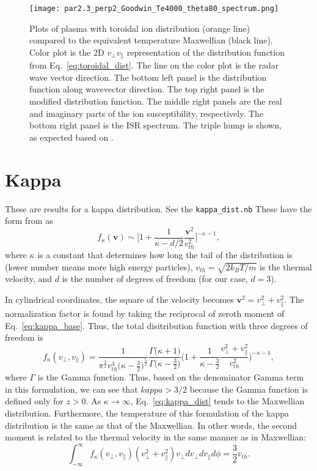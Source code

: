 \begin{figure}[!htb]
	\texttt{[image: par2.3\_perp2\_Goodwin\_Te4000\_theta80\_spectrum.png]}
	\caption{Plots of plasma with toroidal ion distribution (orange line) compared to the equivalent temperature Maxwellian (black line).
	Color plot is the 2D $v_\perp v_\parallel$ representation of the distribution function from Eq.~\ref{eq:toroidal_dist}.
	The line on the color plot is the radar wave vector direction.
	The bottom left panel is the distribution function along wavevector direction.
	The top right panel is the modified distribution function.
	The middle right panels are the real and imaginary parts of the ion susceptibility, respectively.
	The bottom right panel is the ISR spectrum.
	The triple hump is shown, as expected based on \cite{goodwin2018}.}
	\label{f:toroidal}
\end{figure}


\section{Kappa}

These are results for a kappa distribution. See the \verb*|kappa_dist.nb| These have the form from \citep{livadiotis2015} as
\begin{equation}
	f_\kappa(\mathbf{v}) \sim \Bigg[   
	1 + \frac{1}{\kappa-d/2} \frac{\mathbf{v}^2}{v_{th}^2}
	\Bigg]^{-\kappa-1},
	\label{eq:kappa_base}
\end{equation}
where $\kappa$ is a constant that determines how long the tail of the distribution is (lower number means more high energy particles),
$v_{th}=\sqrt{2k_BT/m}$ is the thermal velocity,
and $d$ is the number of degrees of freedom (for our case, $d=3$).

In cylindrical coordinates, the square of the velocity becomes $\mathbf{v}^2=v_\perp^2+v_\parallel^2$. 
The normalization factor is found by taking the reciprocal of zeroth moment of Eq.~\ref{eq:kappa_base}.
Thus, the total disitribution function with three degrees of freedom is
\begin{equation}
	f_{\kappa}(v_\perp,v_\parallel) = 
	\frac{1}{\pi^{\frac{3}{2}} v_{th}^3 \big(\kappa-\frac{3}{2}\big)^{\frac{5}{2}}}
	\frac{\Gamma\big(\kappa+1\big)}{\Gamma\big(\kappa-\frac{3}{2}\big)}
	\Bigg( 1 + \frac{1}{\kappa-\frac{3}{2}} \frac{v_\perp^2+v_\parallel^2}{v_{th}^2}
	\Bigg)^{-\kappa-1},
	\label{eq:kappa_dist}
\end{equation}
where $\Gamma$ is the Gamma function.
Thus, based on the denominator Gamma term in this formulation, we can see that $kappa>3/2$ because the Gamma function is defined only for $z>0$.
As $\kappa\rightarrow\infty$, Eq.~\ref{eq:kappa_dist} tends to the Maxwellian distribution.
Furthermore, the temperature of this formulation of the kappa distribution is the same as that of the Maxwellian. 
In other words, the second moment is related to the thermal velocity in the same manner as in Maxwellian:
\begin{equation}
	\int_{-\infty}^\infty f_{\kappa}(v_\perp,v_\parallel) (v_\perp^2+v_\parallel^2) v_\perp dv_\perp dv_\parallel d\phi = 
	\frac{3}{2} v_{th}.
\end{equation}










